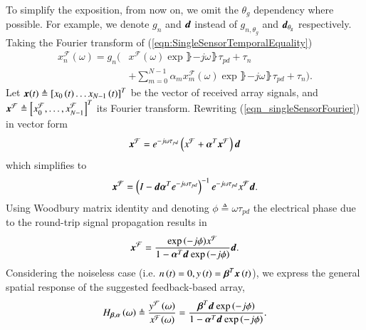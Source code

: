     To simplify the exposition, from now on, we omit the $\theta_{g}$ dependency where possible. For example, we denote $g_n$ and $\boldsymbol{d}$ instead of $g_{n,\theta_g}$ and $\boldsymbol{d}_{\theta_{g}}$ respectively. 
    Taking the Fourier transform of (\ref{eqn:SingleSensorTemporalEquality})
    \begin{equation}
        \label{eqn_singleSensorFourier}
            \begin{split}
                x_{n}^{\mathcal{F}}(\omega) =
                g_n\Bigg( & x^{\mathcal{F}}(\omega)
                \exp\rBrace{-j\omega\rBrace{\tau_{pd}+\tau_{n}}}
                \\&+\sum_{m=0}^{N-1}
                {
                \alpha_{m}x_{m}^{\mathcal{F}}(\omega)
                \exp\rBrace{-j\omega\rBrace{\tau_{pd}+\tau_{n}}}
                }\Bigg). 
            \end{split}
    \end{equation}
    Let $\boldsymbol{x}{\left({t}\right)}\triangleq\left[{x_{0}\left({t}\right)\hdots{}x_{N-1}\left({t}\right)}\right]^{T}$ be the vector of received array signals, and  $\boldsymbol{x}^{\mathcal{F}}\triangleq\left[{x_{0}^{\mathcal{F}},\hdots,x_{N-1}^{\mathcal{F}}}\right]^{T}$ its Fourier transform. Rewriting (\ref{eqn_singleSensorFourier}) in  vector form
    $$
    \boldsymbol{x}^{\mathcal{F}} = e^{-j\omega\tau_{pd}} \left({x^{\mathcal{F}}+\boldsymbol{\alpha}^{T} \boldsymbol{x}^{\mathcal{F}}}\right)\boldsymbol{d}
    $$
    which simplifies to
    $$
    \boldsymbol{x}^{\mathcal{F}} =\left({I-\boldsymbol{d}\boldsymbol{\alpha}^{T}{}e^{-j\omega\tau_{pd}}}\right)^{-1}e^{-j\omega\tau_{pd}}x^{\mathcal{F}} \boldsymbol{d} .
    $$
    Using Woodbury matrix identity \cite{woodbury1950inverting} and denoting $\phi\triangleq\omega\tau_{pd}$ the electrical phase due to the round-trip signal propagation results in
    $$
    \boldsymbol{x}^{\mathcal{F}}
    =
    \frac{    
    \exp{\left({-j\phi}\right)}x^{\mathcal{F}}
    }{
    1 - \boldsymbol{\alpha}^{T}\boldsymbol{d}_{}{}\exp{\left({-j\phi}\right)}
    }\boldsymbol{d}.
    $$
    Considering the noiseless case (i.e. $n\left({t}\right)=0, y\left({t}\right)=\boldsymbol{\beta}^{T}{}\boldsymbol{x}\left({t}\right)$),
    we express the general spatial response of the suggested feedback-based array, 
    \begin{equation}
    \label{eqn:GeneralFeedbackTransferFunction}
    H_{\vBeta,\vAlpha}\rBrace{\omega} 
    \triangleq
    \frac{y^{\mathcal{F}}\rBrace{\omega}}{x^{\mathcal{F}}(\omega)} 
    =
    \frac{    
    \bTd{}\exp\rBrace{-j\phi}
    }{
    1 - \aTd{}\exp\rBrace{-j\phi}
    }.
    \end{equation}

